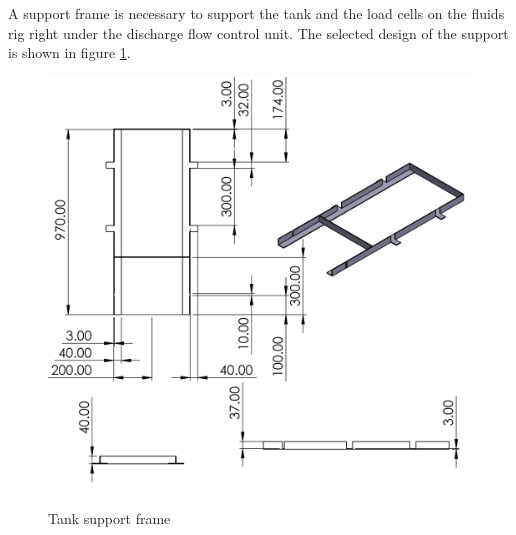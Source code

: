 \begin{itemize}
A support frame is necessary to support the tank and the load cells on the fluids rig right under the discharge flow control unit. The selected design of the support is shown in figure \ref{fig:tank_support_frame}. 
\begin{figure}[H]
    \centering
    \includegraphics[height=.4\textheight]{Figures/tankSupport.JPG}
    \caption{Tank support frame}
    \label{fig:tank_support_frame}
\end{figure}


\end{itemize}
